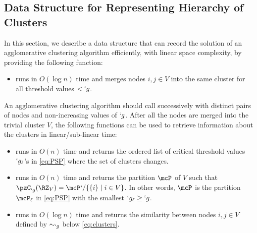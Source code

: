 \subsection{Data Structure for Representing Hierarchy of Clusters}
\label{sec:data_structure}

In this section, we describe a data structure that can record the solution of an agglomerative
clustering algorithm efficiently, with linear space complexity, by providing the following function:
\begin{itemize}
	\item {} runs in $O(\log n)$ time and
	merges nodes $i,j\in V$ into the same cluster for all threshold values $<`g$.
\end{itemize} 
An agglomerative clustering algorithm should call \merge successively with distinct pairs of nodes and 
non-increasing values of $`g$. After all the nodes are merged into the trivial cluster $V$, the
following functions can be used to retrieve information about the clusters in linear/sub-linear
time:
\begin{itemize}
	\item \getCriticalValues{} runs in $O(n)$ time and returns the ordered list of critical threshold
		values $`g_{\ell}$'s in \eqref{eq:PSP} where the set of clusters changes.
	\item {} runs in $O(n)$ time and returns the partition $\mcP$ of $V$ such that
		$\pzC_{`g}(\RZ_V)=\mcP`/\Set {\Set {i}\mid i\in V}$. In other words, $\mcP$ is the partition
		$\mcP_{\ell}$ in \eqref{eq:PSP} with the smallest $`g_{\ell}\geq `g$.
	\item {} runs in $O(\log n)$ time and returns the similarity between nodes
		$i,j\in V$ defined by $\sim_{`g}$ below \eqref{eq:clusters}.  
\end{itemize}

